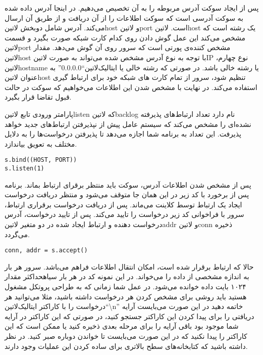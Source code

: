 \documentclass[]{article}
\begin{document}
  پس از ایجاد سوکت‌ آدرس مربوطه را به آن تخصیص می‌دهیم.
  در اینجا آدرس داده شده به سوکت‌ آدرسی‌ است که سوکت اطلاعات را از آن دریافت و از طریق آن ارسال می‌کند.
  آدرس شامل دوبخش ‌لاتین{host} و ‌لاتین{port} است.
  ‌لاتین{host} یک رشته است که مشخص می‌کند این عمل گوش دادن روی کدام کارت شبکه صورت بگیرد و قسمت ‌لاتین{port} مشخص کننده‌ی پورتی است که سرور روی آن گوش می‌دهد.
  مقدار ‌لاتین{host} با توجه به نوع آدرس مشخص شده می‌تواند به صورت ‌لاتین{IP} نوع چهارم،  ‌لاتین{hostname} یا رشته خالی باشد.
  در صورتی که رشته خالی یا ‌ایتالیک{‌لاتین{``0.0.0.0''}} به عنوان ‌لاتین{host} تنظیم شود،
  سرور از تمام کارت های شبکه خود برای ارتباط گیری استفاده می‌کند.
  در نهایت با مشخص شدن این اطلاعات می‌خواهیم که سوکت در حالت قبول تقاضا قرار بگیرد.

  پارامتر ورودی تابع ‌لاتین{listen} که ‌لاتین{backlog} نام دارد تعداد ارتباط‌های پذیرفته نشده‌ای را مشخص می‌کند که سیستم عامل
  پیش از نپذیرفتن ارتباط‌های جدید خواهد پذیرفت. این تعداد به برنامه شما اجازه می‌دهد تا پذیرفتن درخواست‌ها را به دلایل مختلف به تعویق بیاندازد.

  \begin{latin}
  \begin{verbatim}
s.bind((HOST, PORT))
s.listen(1)
  \end{verbatim}
  \end{latin}

  پس از مشخص شدن اطلاعات آدرس، سوکت باید منتظر برقرای ارتباط بماند.
  برنامه پس از برخورد با کد زیر در این همان جا متوقف می‌شود و منتظر دریافت درخواست ایجاد یک ارتباط توسط کلاینت می‌ماند.
  پس از دریافت درخواست برقراری ارتباط، سرور با فراخوانی کد زیر درخواست را تایید می‌کند.
  پس از تایید درخواست، آدرس درخواست دهنده و ارتباط ایجاد شده در دو متغیر ‌لاتین{addr} و ‌لاتین{conn} ذخیره می‌گردد.

  \begin{latin}
  \begin{verbatim}
conn, addr = s.accept()
  \end{verbatim}
  \end{latin}

  حالا که ارتباط برقرار شده است، امکان انتقال اطلاعات فراهم می‌باشد.
  سرور هر بار به اندازه مشخصی از داده را می‌خواند. در این نمونه کد در هر بار ‌سیاه{حداکثر} مقدار ۱۰۲۴ بایت داده خوانده می‌شود.
  در عمل شما زمانی که به طراحی پروتکل مشغول هستید باید روشی برای مشخص کردن هر درخواست داشته باشید، مثلا می‌توانید هر درخواست
  را با کاراکتر ‌ایتالیک{‌لاتین{``\textbackslash n''}} خاتمه دهید در این صورت می‌بایست آرایه دریافتی را برای پیدا کردن این کاراکتر جستجو کنید،
  در صورتی که این کاراکتر در آرایه شما موجود بود باقی آرایه را برای مرحله بعدی ذخیره کنید یا ممکن است که این کاراکتر را پیدا نکنید که
  در این صورت می‌بایست تا خواندن دوباره صبر کنید. در نظر داشته باشید که کتابخانه‌های سطح بالاتری برای ساده کردن این عملیات وجود دارند.
\end{document}
